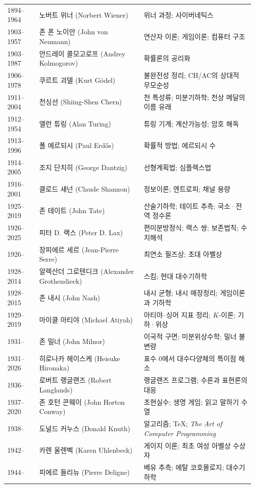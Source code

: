 \begin{center}
\begin{longtable}{@{}L{0.16\textwidth}L{0.24\textwidth}L{0.52\textwidth}@{}}
1894--1964 & 노버트 위너 (Norbert Wiener) & 위너 과정; 사이버네틱스\\
1903--1957 & 존 폰 노이만 (John von Neumann) & 연산자 이론; 게임이론; 컴퓨터 구조\\
1903--1987 & 안드레이 콜모고로프 (Andrey Kolmogorov) & 확률론의 공리화\\
1906--1978 & 쿠르트 괴델 (Kurt Gödel) & 불완전성 정리; CH/AC의 상대적 무모순성\\
1911--2004 & 천싱선 (Shiing-Shen Chern) & 천 특성류; 미분기하학; 천상 메달의 이름 유래\\
1912--1954 & 앨런 튜링 (Alan Turing) & 튜링 기계; 계산가능성; 암호 해독\\
1913--1996 & 폴 에르되시 (Paul Erdős) & 확률적 방법; 에르되시 수\\
1914--2005 & 조지 단치히 (George Dantzig) & 선형계획법; 심플렉스법\\
1916--2001 & 클로드 섀넌 (Claude Shannon) & 정보이론; 엔트로피; 채널 용량\\
1925--2019 & 존 테이트 (John Tate) & 산술기하학; 테이트 추측; 국소·전역 정수론\\
1926--2025 & 피터 D. 랙스 (Peter D. Lax) & 편미분방정식; 랙스 쌍; 보존법칙; 수치해석\\
1926-- & 장피에르 세르 (Jean-Pierre Serre) & 최연소 필즈상; 초대 아벨상\\
1928--2014 & 알렉산더 그로텐디크 (Alexander Grothendieck) & 스킴; 현대 대수기하학\\
1928--2015 & 존 내시 (John Nash) & 내시 균형; 내시 매장정리; 게임이론과 기하학\\
1929--2019 & 마이클 아티야 (Michael Atiyah) & 아티야--싱어 지표 정리; $K$-이론; 기하·위상\\
1931-- & 존 밀너 (John Milnor) & 이국적 구면; 미분위상수학; 밀너 불변량\\
1931--2026 & 히로나카 헤이스케 (Heisuke Hironaka) & 표수 $0$에서 대수다양체의 특이점 해소\\
1936-- & 로버트 랭글랜즈 (Robert Langlands) & 랭글랜즈 프로그램; 수론과 표현론의 대응\\
1937--2020 & 존 호턴 콘웨이 (John Horton Conway) & 초현실수; 생명 게임; 읽고 말하기 수열\\
1938-- & 도널드 커누스 (Donald Knuth) & 알고리즘; \TeX; \textit{The Art of Computer Programming}\\
1942-- & 카렌 울렌벡 (Karen Uhlenbeck) & 게이지 이론; 최초 여성 아벨상 수상자\\
1944-- & 피에르 들리뉴 (Pierre Deligne) & 베유 추측; 에탈 코호몰로지; 대수기하학\\

\end{longtable}
\end{center}
